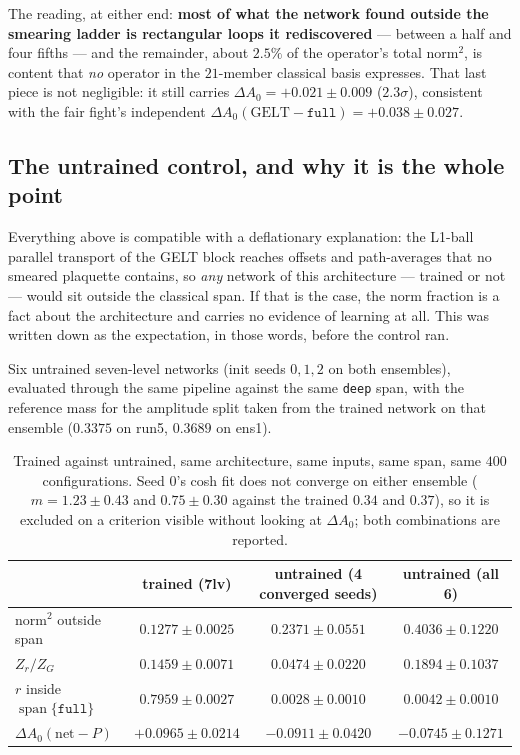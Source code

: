 \documentclass[11pt,a4paper]{article}
\newcommand{\dAzero}{\Delta A_0}
\newcommand{\spn}{\operatorname{span}}
\newcommand{\arm}[1]{\texttt{#1}}
\begin{document}
The reading, at either end: \textbf{most of what the network found outside the
smearing ladder is rectangular loops it rediscovered} --- between a half and
four fifths --- and the remainder, about $2.5\%$ of the operator's total
norm${}^2$, is content that \emph{no} operator in the $21$-member classical
basis expresses. That last piece is not negligible: it still carries
$\dAzero = +0.021 \pm 0.009$ ($2.3\sigma$), consistent with the fair fight's
independent $\dAzero(\text{GELT} - \arm{full}) = +0.038 \pm 0.027$.

\subsection{The untrained control, and why it is the whole point}
\label{sec:untrained}

Everything above is compatible with a deflationary explanation: the L1-ball
parallel transport of the GELT block reaches offsets and path-averages that no
smeared plaquette contains, so \emph{any} network of this architecture ---
trained or not --- would sit outside the classical span. If that is the case,
the norm fraction is a fact about the architecture and carries no evidence of
learning at all. This was written down as the expectation, in those words,
before the control ran.

Six untrained seven-level networks (init seeds $0,1,2$ on both ensembles),
evaluated through the same pipeline against the same \arm{deep} span, with the
reference mass for the amplitude split taken from the trained network on that
ensemble ($0.3375$ on run5, $0.3689$ on ens1).

\begin{table}[htbp]
\centering\small
\caption{Trained against untrained, same architecture, same inputs, same span,
same $400$ configurations. Seed $0$'s cosh fit does not converge on either
ensemble ($m = 1.23 \pm 0.43$ and $0.75 \pm 0.30$ against the trained $0.34$ and
$0.37$), so it is excluded on a criterion visible without looking at $\dAzero$;
both combinations are reported.}
\label{tab:untrained}
\begin{tabular}{@{}lccc@{}}
\toprule
 & trained (7lv) & untrained (4 converged seeds) & untrained (all 6) \\
\midrule
norm${}^2$ outside span        & $0.1277 \pm 0.0025$ & $0.2371 \pm 0.0551$ & $0.4036 \pm 0.1220$ \\
$Z_r/Z_G$                      & $0.1459 \pm 0.0071$ & $0.0474 \pm 0.0220$ & $0.1894 \pm 0.1037$ \\
$r$ inside $\spn\{\arm{full}\}$& $0.7959 \pm 0.0027$ & $0.0028 \pm 0.0010$ & $0.0042 \pm 0.0010$ \\
$\dAzero(\text{net} - P)$      & $\mathbf{+0.0965 \pm 0.0214}$ & $\mathbf{-0.0911 \pm 0.0420}$ & $-0.0745 \pm 0.1271$ \\
\bottomrule
\end{tabular}
\end{table}
\end{document}
